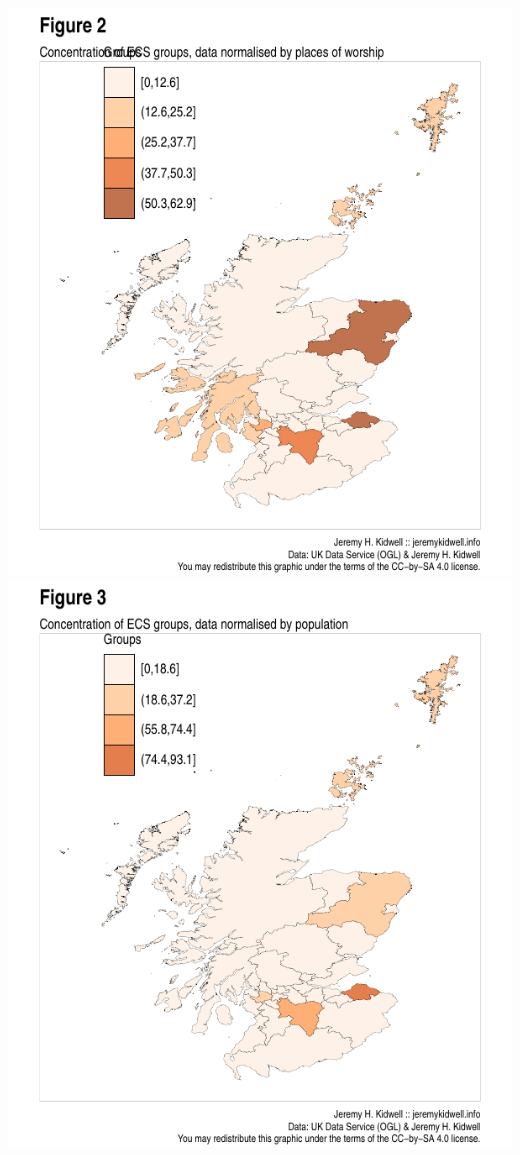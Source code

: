 \documentclass[11pt,]{article}
\begin{document}
\includegraphics{figures/plot_admin_ecs_normed_choropleth-1.pdf}
\includegraphics{figures/plot_admin_ecs_normed_choropleth-2.pdf}
\end{document}
